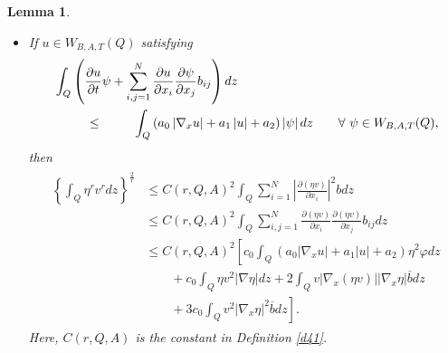 \documentclass[11pt, a4paper]{article}
\newtheorem{lemma}[theorem]{Lemma}
\numberwithin{equation}{section}
\newcommand{\coex}[2][\hphantom{longexplanation}]{%
  \underset{{#1}}{\overset{\hphantom{longexplanation}}{#2}}
}
\newcommand{\abs}[1]{\left\lvert #1\right\rvert}
\begin{document}
\begin{lemma}
\begin{itemize}
\item[$(ii)$]  %
  If  $u\in W_{B,A,T}(Q)$ satisfying
  \begin{align}
    \begin{split}
      &\int_{Q}\left( \frac{\partial u}{\partial t}\psi +
        \sum_{i,j=1}^{N}\frac{\partial u}{\partial x_{i}}\frac{\partial
        \psi}{\partial x_{j}}b_{ij}  \right)dz\\
      &\coex{\le}\int_{Q} \left( a_{0} \abs{\nabla_{x} u }+a_{1}\abs{u}  +a_{2}
        \right) \abs{\psi} dz \qquad\forall~\psi\in W_{B,A,T}(Q),
    \end{split}
 \label{le460}
 \end{align}
then
\begin{align}
  \label{p103}
  \begin{split}
    \left\{\int_{Q}\eta^{r}v^{r}dz\right\}^{\frac{2}{r}}
    &\le C(r,Q,A)^2\int_{Q}\sum_{i=1}^{N}\abs{\frac{\partial (\eta v)}{\partial x_{i}}}^{2}bdz\\
    &\le C(r,Q,A)^2\int_{Q}\sum_{i,j=1}^{N}\frac{\partial (\eta v)}{\partial x_{i}}\frac{\partial(\eta v)}{\partial x_{j}}b_{ij}dz\\
    &\le C(r,Q,A)^2 \left[ c_0\int_{Q}\left(  a_{0}\abs{\nabla_{x} u}+a_{1}\abs{u}+a_{2} \right)\eta^{2}\varphi dz \right. \\
    &\qquad+  c_{0}\int_{Q}\eta v^{2}\abs{\nabla \eta} dz +  2 \int_{Q}v
      \abs{\nabla_{x}(\eta v)} \abs{\nabla_x \eta}\overline{b}dz\\
    &\qquad+  \left.3c_{0}\int_{Q}v^{2}\abs{\nabla_x \eta}^{2}\overline{b}dz \right].
  \end{split}
\end{align}
Here, $C(r,Q,A)$ is the constant in Definition \ref{d41}.
\end{itemize}
\label{lem12}
\end{lemma}
\end{document}
